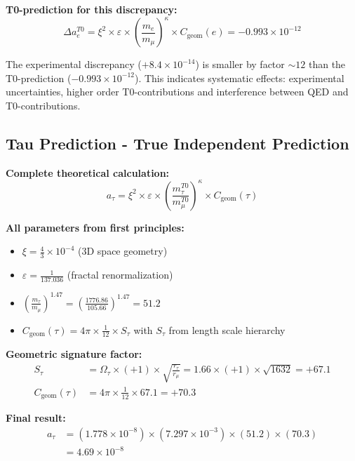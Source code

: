 \documentclass[12pt,a4paper]{article}
\numberwithin{equation}{section}
\newcommand{\xipar}{\xi}
\newcommand{\epsilonT}{\varepsilon}
\newcommand{\Cgeom}{C_{\text{geom}}}
\newcommand{\kappaT}{\kappa}
\newcommand{\Omegafactor}{\Omega}
\begin{document}
	\textbf{T0-prediction for this discrepancy:}
	\begin{equation}
		\Delta a_e^{T0} = \xipar^2 \times \epsilonT \times \left(\frac{m_e}{m_\mu}\right)^{\kappaT} \times \Cgeom(e) = -0.993 \times 10^{-12}
		\label{eq:electron_t0}
	\end{equation}
	
	The experimental discrepancy ($+8.4 \times 10^{-14}$) is smaller by factor $\sim 12$ than the T0-prediction ($-0.993 \times 10^{-12}$). This indicates systematic effects: experimental uncertainties, higher order T0-contributions and interference between QED and T0-contributions.
	
	\subsection{Tau Prediction - True Independent Prediction}
	
	\textbf{Complete theoretical calculation:}
	\begin{equation}
		a_\tau = \xipar^2 \times \epsilonT \times \left(\frac{m_\tau^{T0}}{m_\mu^{T0}}\right)^{\kappaT} \times \Cgeom(\tau)
		\label{eq:tau_formula}
	\end{equation}
	
	\textbf{All parameters from first principles:}
	\begin{itemize}
		\item $\xipar = \frac{4}{3} \times 10^{-4}$ (3D space geometry)
		\item $\epsilonT = \frac{1}{137.036}$ (fractal renormalization)
		\item $\left(\frac{m_\tau}{m_\mu}\right)^{1.47} = \left(\frac{1776.86}{105.66}\right)^{1.47} = 51.2$
		\item $\Cgeom(\tau) = 4\pi \times \frac{1}{12} \times S_\tau$ with $S_\tau$ from length scale hierarchy
	\end{itemize}
	
	\textbf{Geometric signature factor:}
	\begin{align}
		S_\tau &= \Omegafactor_\tau \times (+1) \times \sqrt{\frac{r_\tau}{r_\mu}} = 1.66 \times (+1) \times \sqrt{1632} = +67.1\\
		\Cgeom(\tau) &= 4\pi \times \frac{1}{12} \times 67.1 = +70.3
		\label{eq:tau_signature}
	\end{align}
	
	\textbf{Final result:}
	\begin{align}
		a_\tau &= (1.778 \times 10^{-8}) \times (7.297 \times 10^{-3}) \times (51.2) \times (70.3)\\
		&= 4.69 \times 10^{-8}
		\label{eq:tau_basic}
	\end{align}
	
\end{document}
